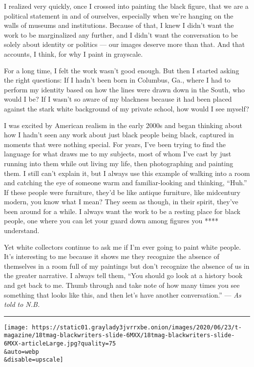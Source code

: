 I realized very quickly, once I crossed into painting the black figure,
that we are a political statement in and of ourselves, especially when
we're hanging on the walls of museums and institutions. Because of that,
I knew I didn't want the work to be marginalized any further, and I
didn't want the conversation to be solely about identity or politics ---
our images deserve more than that. And that accounts, I think, for why I
paint in grayscale.

For a long time, I felt the work wasn't good enough. But then I started
asking the right questions: If I hadn't been born in Columbus, Ga.,
where I had to perform my identity based on how the lines were drawn
down in the South, who would I be? If I wasn't so aware of my blackness
because it had been placed against the stark white background of my
private school, how would I see myself?

I was excited by American realism in the early 2000s and began thinking
about how I hadn't seen any work about just black people being black,
captured in moments that were nothing special. For years, I've been
trying to find the language for what draws me to my subjects, most of
whom I've cast by just running into them while out living my life, then
photographing and painting them. I still can't explain it, but I always
use this example of walking into a room and catching the eye of someone
warm and familiar-looking and thinking, ``Huh.'' If these people were
furniture, they'd be like antique furniture, like midcentury modern, you
know what I mean? They seem as though, in their spirit, they've been
around for a while. I always want the work to be a resting place for
black people, one where you can let your guard down among figures you
**** understand.

Yet white collectors continue to ask me if I'm ever going to paint white
people. It's interesting to me because it shows me they recognize the
absence of themselves in a room full of my paintings but don't recognize
the absence of us in the greater narrative. I always tell them, ``You
should go look at a history book and get back to me. Thumb through and
take note of how many times you see something that looks like this, and
then let's have another conversation.'' --- \emph{As told to N.B.}

\begin{center}\rule{0.5\linewidth}{\linethickness}\end{center}

\texttt{[image: https://static01.graylady3jvrrxbe.onion/images/2020/06/23/t-magazine/18tmag-blackwriters-slide-6MXX/18tmag-blackwriters-slide-6MXX-articleLarge.jpg?quality=75\\\&auto=webp\\\&disable=upscale]}

